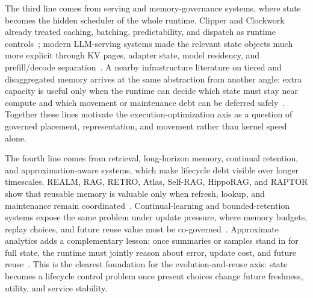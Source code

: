 \documentclass[acmsmall,screen,review]{acmart}
\begin{document}
The third line comes from serving and memory-governance systems, where state becomes the hidden scheduler of the whole runtime. Clipper and Clockwork already treated caching, batching, predictability, and dispatch as runtime controls~\cite{crankshaw2017clipper,gujarati2020clockwork}; modern LLM-serving systems made the relevant state objects much more explicit through KV pages, adapter state, model residency, and prefill/decode separation~\cite{shen2019nexus,crankshaw2020inferline,romero2021infaas,yu2022orca,sheng2023flexgen,li2023alpaserve,chen2024punica,kwon2023pagedattention,sheng2023slora,zheng2023sglang,agrawal2024sarathi,zhong2024distserve,patel2024splitwise,holmes2024fastgen,yu2025prism,zhang2025jenga}. A nearby infrastructure literature on tiered and disaggregated memory arrives at the same abstraction from another angle: extra capacity is useful only when the runtime can decide which state must stay near compute and which movement or maintenance debt can be deferred safely~\cite{hu2024aceso,zhong2024unimem,jalalian2024extmem,raybuck2021hemem,cho2024coaxial,zhao2025equilibria,peng2024scalacache,wang2025finemem,chang2024gmt,li2024streamcache,qiu2025hotrap}. Together these lines motivate the execution-optimization axis as a question of governed placement, representation, and movement rather than kernel speed alone.

The fourth line comes from retrieval, long-horizon memory, continual retention, and approximation-aware systems, which make lifecycle debt visible over longer timescales. REALM, RAG, RETRO, Atlas, Self-RAG, HippoRAG, and RAPTOR show that reusable memory is valuable only when refresh, lookup, and maintenance remain coordinated~\cite{guu2020realm,lewis2020rag,borgeaud2022retro,izacard2022atlas,asai2024selfrag,wang2024hipporag,sarthi2024raptor}. Continual-learning and bounded-retention systems expose the same problem under update pressure, where memory budgets, replay choices, and future reuse value must be co-governed~\cite{kirkpatrick2017ewc,lopez2017gem,rebuffi2017icarl,chaudhry2019agem,rolnick2019experience,aljundi2019mir,buzzega2020der,hayes2020remind,prabhu2020gdumb,delange2021survey}. Approximate analytics adds a complementary lesson: once summaries or samples stand in for full state, the runtime must jointly reason about error, update cost, and future reuse~\cite{agarwal2013blinkdb,goiri2015approxhadoop,wang2018approxjoin,hu2018streamapprox,chen2018incapprox}. This is the clearest foundation for the evolution-and-reuse axis: state becomes a lifecycle control problem once present choices change future freshness, utility, and service stability.
\end{document}
